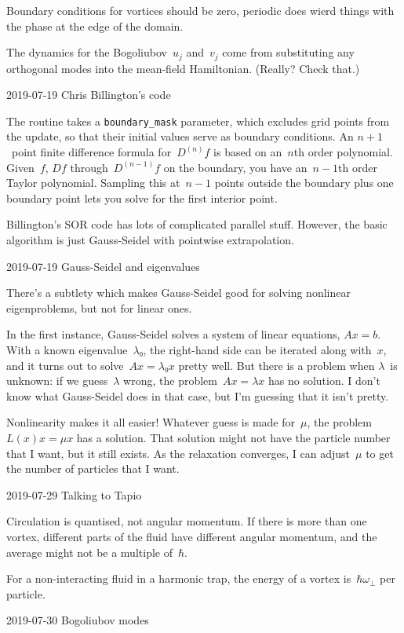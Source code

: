 Boundary conditions for vortices should be zero, periodic does wierd things with the phase at the edge of the domain.

The dynamics for the Bogoliubov~$u_j$ and~$v_j$ come from substituting any orthogonal modes into the mean-field Hamiltonian.  (Really?  Check that.) 

2019-07-19 Chris Billington's code

The routine takes a {\tt boundary\_mask} parameter, which excludes grid points from the update, so that their initial values serve as boundary conditions.  An $n+1$~point finite difference formula for~$D^{(n)}f$ is based on an~$n$th order polynomial.  Given~$f$, $Df$ through~$D^{(n-1)}f$ on the boundary, you have an~$n-1$th order Taylor polynomial.  Sampling this at~$n-1$ points outside the boundary plus one boundary point lets you solve for the first interior point.

Billington's SOR code has lots of complicated parallel stuff.  However, the basic algorithm is just Gauss-Seidel with pointwise extrapolation.

2019-07-19 Gauss-Seidel and eigenvalues

There's a subtlety which makes Gauss-Seidel good for solving nonlinear eigenproblems, but not for linear ones.

In the first instance, Gauss-Seidel solves a system of linear equations, $Ax=b$.  With a known eigenvalue~$λ₀$, the right-hand side can be iterated along with~$x$, and it turns out to solve~$Ax=λ₀x$ pretty well.  But there is a problem when $λ$~is unknown: if we guess~$λ$ wrong, the problem~$Ax=λx$ has no solution.  I don't know what Gauss-Seidel does in that case, but I'm guessing that it isn't pretty.

Nonlinearity makes it all easier!  Whatever guess is made for~$μ$, the problem~$L(x)x=μx$ has a solution.  That solution might not have the particle number that I want, but it still exists.  As the relaxation converges, I can adjust~$μ$ to get the number of particles that I want.

2019-07-29 Talking to Tapio

Circulation is quantised, not angular momentum.  If there is more than one vortex, different parts of the fluid have different angular momentum, and the average might not be a multiple of~$ℏ$.

For a non-interacting fluid in a harmonic trap, the energy of a vortex is~$ℏω_\perp$ per particle.

2019-07-30 Bogoliubov modes

